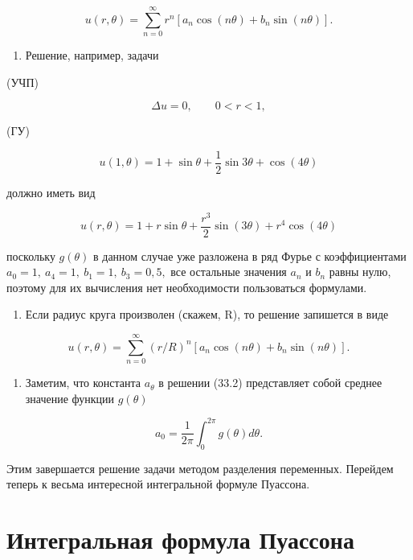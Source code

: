 \documentclass[
  ukrainian,
]{article}
\providecommand{\tightlist}{%
  \setlength{\itemsep}{0pt}\setlength{\parskip}{0pt}}
\begin{document}
\[
u(r, \theta) = \sum_{n=0}^{\infty} r^n [a_n \cos(n\theta) + b_n \sin(n\theta)].
\]

\begin{enumerate}
\def\labelenumi{\arabic{enumi}.}
\setcounter{enumi}{1}
\tightlist
\item
  Решение, например, задачи
\end{enumerate}

(УЧП)

\[
\Delta u = 0, \qquad 0 < r < 1,
\]

(ГУ)

\[
u(1, \theta) = 1 + \sin \theta + \frac{1}{2} \sin 3\theta + \cos (4\theta)
\]

должно иметь вид

\[
u(r, \theta) = 1 + r \sin \theta + \frac{r^3}{2} \sin (3\theta) + r^4 \cos (4\theta)
\]

поскольку \(g(\theta)\) в данном случае уже разложена в ряд Фурье с
коэффициентами \(a_0=1,\ a_4=1,\ b_1=1,\ b_3=0,5,\) все остальные
значения \(a_n\) и \(b_n\) равны нулю, поэтому для их вычисления нет
необходимости пользоваться формулами.

\begin{enumerate}
\def\labelenumi{\arabic{enumi}.}
\setcounter{enumi}{2}
\tightlist
\item
  Если радиус круга произволен (скажем, R), то решение запишется в виде
\end{enumerate}

\[
u(r, \theta) = \sum_{n=0}^{\infty} (r/R)^n [a_n \cos(n\theta) + b_n \sin(n\theta)].
\]

\begin{enumerate}
\def\labelenumi{\arabic{enumi}.}
\setcounter{enumi}{3}
\tightlist
\item
  Заметим, что константа \(a_{\theta}\) в решении (33.2) представляет
  собой среднее значение функции \(g\left(\theta\right)\)
\end{enumerate}

\[
a_0 = \frac{1}{2\pi} \int_0^{2\pi} g(\theta) d\theta.
\]

Этим завершается решение задачи методом разделения переменных. Перейдем
теперь к весьма интересной интегральной формуле Пуассона.

\section{Интегральная формула
Пуассона}\label{ux438ux43dux442ux435ux433ux440ux430ux43bux44cux43dux430ux44f-ux444ux43eux440ux43cux443ux43bux430-ux43fux443ux430ux441ux441ux43eux43dux430}
\end{document}
